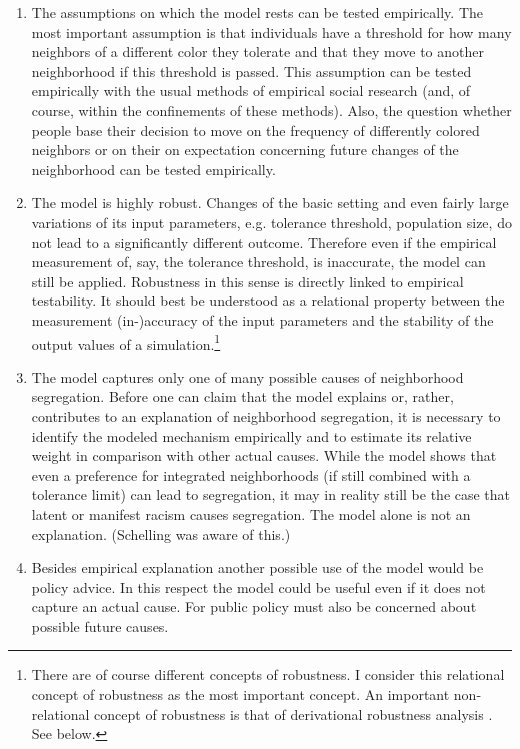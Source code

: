 \documentclass[12pt, english, a4paper]{article}
\begin{document}
\begin{enumerate}

\item The assumptions on which the model rests can be tested
  empirically. The most important assumption is that individuals have
  a threshold for how many neighbors of a different color they
  tolerate and that they move to another neighborhood if this
  threshold is passed. This assumption can be tested empirically with
  the usual methods of empirical social research (and, of course,
  within the confinements of these methods). Also, the question
  whether people base their decision to move on the frequency of
  differently colored neighbors or on their on expectation concerning
  future changes of the neighborhood can be tested empirically.

\item The model is highly robust. Changes of the basic setting and
  even fairly large variations of its input parameters, e.g. tolerance
  threshold, population size, do not lead to a significantly different
  outcome. Therefore even if the empirical measurement of, say, the
  tolerance threshold, is inaccurate, the model can still be applied.
  Robustness in this sense is directly linked to empirical
  testability. It should best be understood as a relational property
  between the measurement (in-)accuracy of the input parameters and
  the stability of the output values of a simulation.\footnote{There
    are of course different concepts of robustness. I consider this
    relational concept of robustness as the most important concept. An
    important non-relational concept of robustness is that of
    derivational robustness analysis
    \citep{kuorikoski-lehtinen:2009}. See below.}

\item The model captures only one of many possible causes of
  neighborhood segregation. Before one can claim that the model
  explains or, rather, contributes to an explanation of neighborhood
  segregation, it is necessary to identify the modeled mechanism
  empirically and to estimate its relative weight in comparison with
  other actual causes. While the model shows that even a preference
  for integrated neighborhoods (if still combined with a tolerance
  limit) can lead to segregation, it may in reality still be the case
  that latent or manifest racism causes segregation. The model alone
  is not an explanation. (Schelling was aware of this.)

\item Besides empirical explanation another possible use of the model
  would be policy advice. In this respect the model could be useful
  even if it does not capture an actual cause. For public policy must
  also be concerned about possible future causes.


\end{enumerate}
\end{document}
